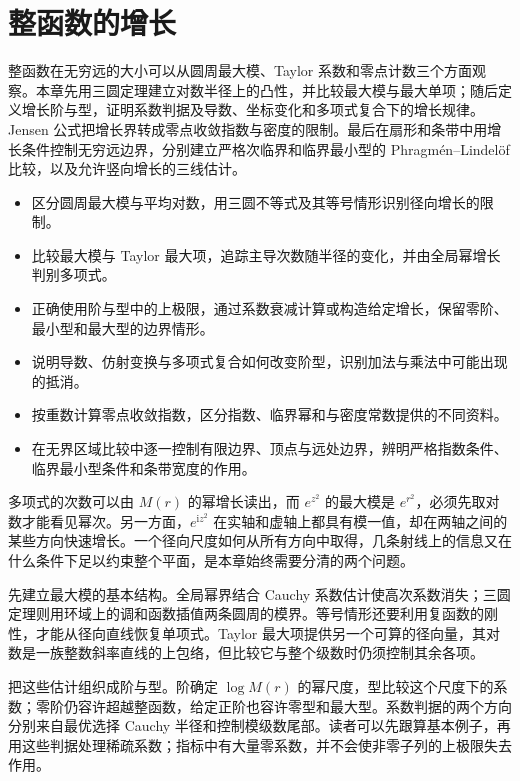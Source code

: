 \chapter{整函数的增长}
\label{b3:ch:19}
\begin{chapterabstract}
整函数在无穷远的大小可以从圆周最大模、Taylor 系数和零点计数三个方面观察。本章先用三圆定理建立对数半径上的凸性，并比较最大模与最大单项；随后定义增长阶与型，证明系数判据及导数、坐标变化和多项式复合下的增长规律。Jensen 公式把增长界转成零点收敛指数与密度的限制。最后在扇形和条带中用增长条件控制无穷远边界，分别建立严格次临界和临界最小型的 Phragmén--Lindelöf 比较，以及允许竖向增长的三线估计。
\end{chapterabstract}

\begin{learninggoals}
\begin{itemize}
\item 区分圆周最大模与平均对数，用三圆不等式及其等号情形识别径向增长的限制。
\item 比较最大模与 Taylor 最大项，追踪主导次数随半径的变化，并由全局幂增长判别多项式。
\item 正确使用阶与型中的上极限，通过系数衰减计算或构造给定增长，保留零阶、最小型和最大型的边界情形。
\item 说明导数、仿射变换与多项式复合如何改变阶型，识别加法与乘法中可能出现的抵消。
\item 按重数计算零点收敛指数，区分指数、临界幂和与密度常数提供的不同资料。
\item 在无界区域比较中逐一控制有限边界、顶点与远处边界，辨明严格指数条件、临界最小型条件和条带宽度的作用。
\end{itemize}
\end{learninggoals}

多项式的次数可以由 \(M(r)\) 的幂增长读出，而 \(e^{z^2}\) 的最大模是 \(e^{r^2}\)，必须先取对数才能看见幂次。另一方面，\(e^{\mathrm iz^2}\) 在实轴和虚轴上都具有模一值，却在两轴之间的某些方向快速增长。一个径向尺度如何从所有方向中取得，几条射线上的信息又在什么条件下足以约束整个平面，是本章始终需要分清的两个问题。

\ProseParagraphBreak
{}先建立最大模的基本结构。全局幂界结合 Cauchy 系数估计使高次系数消失；三圆定理则用环域上的调和函数插值两条圆周的模界。等号情形还要利用复函数的刚性，才能从径向直线恢复单项式。Taylor 最大项提供另一个可算的径向量，其对数是一族整数斜率直线的上包络，但比较它与整个级数时仍须控制其余各项。

\ProseParagraphBreak
{}把这些估计组织成阶与型。阶确定 \(\log M(r)\) 的幂尺度，型比较这个尺度下的系数；零阶仍容许超越整函数，给定正阶也容许零型和最大型。系数判据的两个方向分别来自最优选择 Cauchy 半径和控制模级数尾部。读者可以先跟算基本例子，再用这些判据处理稀疏系数；指标中有大量零系数，并不会使非零子列的上极限失去作用。

